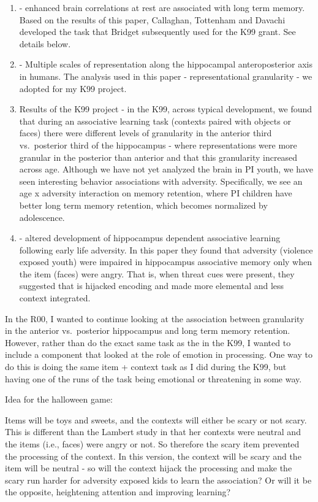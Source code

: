 \documentclass[]{book}
\providecommand{\tightlist}{%
  \setlength{\itemsep}{0pt}\setlength{\parskip}{0pt}}
\begin{document}
\begin{enumerate}
\def\labelenumi{\arabic{enumi}.}
\tightlist
\item
  \citet{tambini_2010} - enhanced brain correlations at rest are associated with long term memory. Based on the results of this paper, Callaghan, Tottenham and Davachi developed the task that Bridget subsequently used for the K99 grant. See details below.
\item
  \citet{brunec_2018} - Multiple scales of representation along the hippocampal anteroposterior axis in humans. The analysis used in this paper - representational granularity - we adopted for my K99 project.
\item
  Results of the K99 project - in the K99, across typical development, we found that during an associative learning task (contexts paired with objects or faces) there were different levels of granularity in the anterior third vs.~posterior third of the hippocampus - where representations were more granular in the posterior than anterior and that this granularity increased across age. Although we have not yet analyzed the brain in PI youth, we have seen interesting behavior associations with adversity. Specifically, we see an age x adversity interaction on memory retention, where PI children have better long term memory retention, which becomes normalized by adolescence.
\item
  \citet{lambert_2019} - altered development of hippocampus dependent associative learning following early life adversity. In this paper they found that adversity (violence exposed youth) were impaired in hippocampus associative memory only when the item (faces) were angry. That is, when threat cues were present, they suggested that is hijacked encoding and made more elemental and less context integrated.
\end{enumerate}

In the R00, I wanted to continue looking at the association between granularity in the anterior vs.~posterior hippocampus and long term memory retention. However, rather than do the exact same task as the in the K99, I wanted to include a component that looked at the role of emotion in processing. One way to do this is doing the same item + context task as I did during the K99, but having one of the runs of the task being emotional or threatening in some way.

Idea for the halloween game:

Items will be toys and sweets, and the contexts will either be scary or not scary. This is different than the Lambert study in that her contexts were neutral and the items (i.e., faces) were angry or not. So therefore the scary item prevented the processing of the context. In this version, the context will be scary and the item will be neutral - so will the context hijack the processing and make the scary run harder for adversity exposed kids to learn the association? Or will it be the opposite, heightening attention and improving learning?
\end{document}
